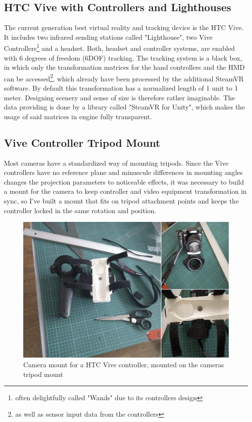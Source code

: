 \subsection{HTC Vive with Controllers and Lighthouses}
The current generation best virtual reality and tracking device is the HTC 
Vive. It includes two infrared sending stations called "Lighthouse", two Vive 
Controllers\footnote{often delightfully called "Wands" due to its controllers 
design} and a headset. Both, headset and controller systems, are enabled with 6 
degrees of freedom (6DOF) tracking. The 
tracking system is a black box, in which only the transformation matrices for 
the hand controllers and the HMD can be accessed\footnote{as well as sensor 
input data from the controllers}, which already have been processed by the 
additional SteamVR software. By default this transformation has a normalized 
length of 1 unit to 1 meter. Designing scenery and sense of size is therefore 
rather imaginable. The data providing is done by a library called "SteamVR for 
Unity", which makes the usage of said matrices in engine fully transparent.

\subsection{Vive Controller Tripod Mount}
Most cameras have a standardized way of mounting tripods. Since the Vive 
controllers have no reference plane and minuscule differences in mounting 
angles changes the projection parameters to noticeable effects, it was 
necessary to build a mount for the camera to keep controller and video 
equipment transformation in sync, so I've built a mount that fits 
on tripod attachment points and keeps the controller locked in the same 
rotation and position.

\begin{figure}[htb]
	\includegraphics[width=\textwidth]{_raw_resources/ViveStrap-Mount.png}
	\caption{Camera mount for a HTC Vive controller, mounted on the cameras 
	tripod mount}
	\label{fig:system:camera-mount}
\end{figure}

